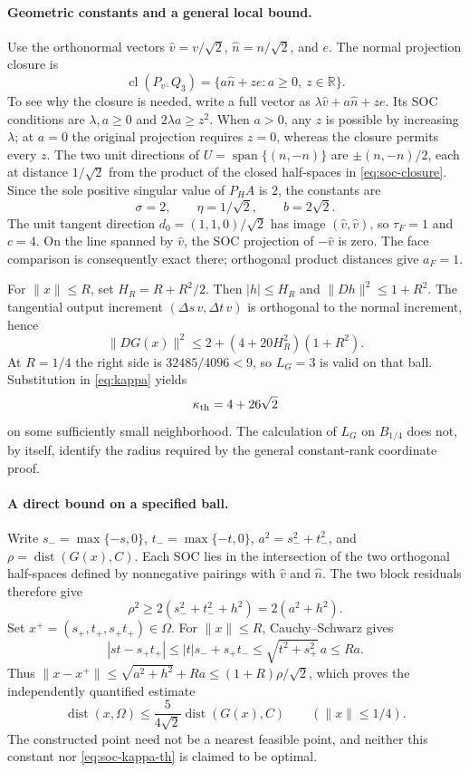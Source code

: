 \documentclass[11pt]{article}
\numberwithin{equation}{section}
\theoremstyle{definition}
\theoremstyle{remark}
\DeclareMathOperator{\dist}{dist}
\DeclareMathOperator{\spann}{span}
\DeclareMathOperator{\cl}{cl}
\newcommand{\R}{\mathbb R}
\newcommand{\norm}[1]{\lVert #1\rVert}
\newcommand{\dset}[2]{\dist(#1,#2)}
\begin{document}
\paragraph{Geometric constants and a general local bound.}
Use the orthonormal vectors $\widehat v=v/\sqrt2$,
$\widehat n=n/\sqrt2$, and $e$. The normal projection closure is
\begin{equation}
 \cl(P_{v^\perp}Q_3)
 =\{a\widehat n+ze:a\geq0,\ z\in\R\}.
 \label{eq:soc-closure}
\end{equation}
To see why the closure is needed, write a full vector as
$\lambda\widehat v+a\widehat n+ze$. Its SOC conditions are
$\lambda,a\geq0$ and $2\lambda a\geq z^2$. When $a>0$, any $z$ is
possible by increasing $\lambda$; at $a=0$ the original projection
requires $z=0$, whereas the closure permits every $z$.
The two unit directions of $U=\spann\{(n,-n)\}$ are
$\pm(n,-n)/2$, each at distance $1/\sqrt2$ from the product of the
closed half-spaces in \eqref{eq:soc-closure}. Since the sole positive
singular value of $P_HA$ is $2$, the constants are
\[
 \sigma=2,\qquad\eta=1/\sqrt2,\qquad b=2\sqrt2.
\]
The unit tangent direction $d_0=(1,1,0)/\sqrt2$ has image
$(\widehat v,\widehat v)$, so $\tau_F=1$ and $c=4$.
On the line spanned by $\widehat v$, the SOC projection of
$-\widehat v$ is zero. The face comparison is consequently exact there;
orthogonal product distances give $a_F=1$.

For $\norm{x}\leq R$, set $H_R=R+R^2/2$. Then $|h|\leq H_R$ and
$\norm{Dh}^2\leq1+R^2$. The tangential output increment
$(\Delta s\,v,\Delta t\,v)$ is orthogonal to the normal increment, hence
\[
 \norm{DG(x)}^2\leq2+(4+20H_R^2)(1+R^2).
\]
At $R=1/4$ the right side is $32485/4096<9$, so $L_G=3$ is valid
on that ball. Substitution in \eqref{eq:kappa} yields
\begin{equation}
 \kappa_{\rm th}=4+26\sqrt2
 \label{eq:soc-kappa-th}
\end{equation}
on some sufficiently small neighborhood. The calculation of $L_G$ on
$B_{1/4}$ does not, by itself, identify the radius required by the
general constant-rank coordinate proof.

\paragraph{A direct bound on a specified ball.}
Write $s_- =\max\{-s,0\}$, $t_- =\max\{-t,0\}$,
$a^2=s_-^2+t_-^2$, and $\rho=\dset{G(x)}{C}$. Each SOC lies in the
intersection of the two orthogonal half-spaces defined by nonnegative
pairings with $\widehat v$ and $\widehat n$. The two block residuals
therefore give
\[
 \rho^2\geq2(s_-^2+t_-^2+h^2)=2(a^2+h^2).
\]
Set $x^+=(s_+,t_+,s_+t_+)\in\Omega$.
For $\norm{x}\leq R$, Cauchy--Schwarz gives
\[
 |st-s_+t_+|\leq |t|s_-+s_+t_-
 \leq\sqrt{t^2+s_+^2}\,a\leq Ra.
\]
Thus $\norm{x-x^+}\leq\sqrt{a^2+h^2}+Ra\leq(1+R)\rho/\sqrt2$,
which proves the independently quantified estimate
\begin{equation}
 \dset{x}{\Omega}\leq\frac5{4\sqrt2}\dset{G(x)}{C}
 \qquad(\norm{x}\leq1/4).
 \label{eq:soc-direct}
\end{equation}
The constructed point need not be a nearest feasible point, and neither
this constant nor \eqref{eq:soc-kappa-th} is claimed to be optimal.
\end{document}
